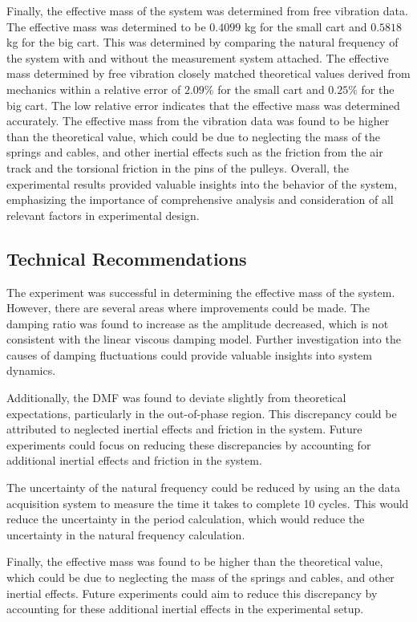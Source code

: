 Finally, the effective mass of the system was determined from free vibration data. The effective mass was determined to be $0.4099$ kg for the small cart and $0.5818$ kg for the big cart. This was determined by comparing the natural frequency of the system with and without the measurement system attached. The effective mass determined by free vibration closely matched theoretical values derived from mechanics within a relative error of $2.09\%$ for the small cart and $0.25\%$ for the big cart. The low relative error indicates that the effective mass was determined accurately. The effective mass from the vibration data was found to be higher than the theoretical value, which could be due to neglecting the mass of the springs and cables, and other inertial effects such as the friction from the air track and the torsional friction in the pins of the pulleys. Overall, the experimental results provided valuable insights into the behavior of the system, emphasizing the importance of comprehensive analysis and consideration of all relevant factors in experimental design.

\subsection{Technical Recommendations}
The experiment was successful in determining the effective mass of the system. However, there are several areas where improvements could be made. The damping ratio was found to increase as the amplitude decreased, which is not consistent with the linear viscous damping model. Further investigation into the causes of damping fluctuations could provide valuable insights into system dynamics. 

Additionally, the DMF was found to deviate slightly from theoretical expectations, particularly in the out-of-phase region. This discrepancy could be attributed to neglected inertial effects and friction in the system. Future experiments could focus on reducing these discrepancies by accounting for additional inertial effects and friction in the system. 

The uncertainty of the natural frequency could be reduced by using an the data acquisition system to measure the time it takes to complete 10 cycles. This would reduce the uncertainty in the period calculation, which would reduce the uncertainty in the natural frequency calculation.

Finally, the effective mass was found to be higher than the theoretical value, which could be due to neglecting the mass of the springs and cables, and other inertial effects. Future experiments could aim to reduce this discrepancy by accounting for these additional inertial effects in the experimental setup.